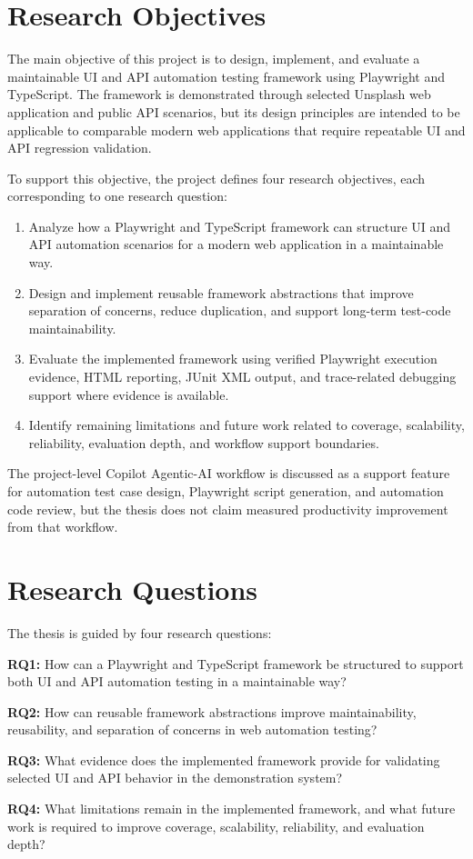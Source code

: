 \section{Research Objectives}
\label{sec:ch1-research-objectives}

The main objective of this project is to design, implement, and evaluate a maintainable UI and API automation testing framework using Playwright and TypeScript. The framework is demonstrated through selected Unsplash web application and public API scenarios, but its design principles are intended to be applicable to comparable modern web applications that require repeatable UI and API regression validation.

To support this objective, the project defines four research objectives, each corresponding to one research question:

\begin{enumerate}
  \item Analyze how a Playwright and TypeScript framework can structure UI and API automation scenarios for a modern web application in a maintainable way.
  \item Design and implement reusable framework abstractions that improve separation of concerns, reduce duplication, and support long-term test-code maintainability.
  \item Evaluate the implemented framework using verified Playwright execution evidence, HTML reporting, JUnit XML output, and trace-related debugging support where evidence is available.
  \item Identify remaining limitations and future work related to coverage, scalability, reliability, evaluation depth, and workflow support boundaries.
\end{enumerate}

The project-level Copilot Agentic-AI workflow is discussed as a support feature for automation test case design, Playwright script generation, and automation code review, but the thesis does not claim measured productivity improvement from that workflow.

\section{Research Questions}
\label{sec:ch1-research-questions}

The thesis is guided by four research questions:

\noindent\textbf{RQ1:} How can a Playwright and TypeScript framework be structured to support both UI and API automation testing in a maintainable way?

\noindent\textbf{RQ2:} How can reusable framework abstractions improve maintainability, reusability, and separation of concerns in web automation testing?

\noindent\textbf{RQ3:} What evidence does the implemented framework provide for validating selected UI and API behavior in the demonstration system?

\noindent\textbf{RQ4:} What limitations remain in the implemented framework, and what future work is required to improve coverage, scalability, reliability, and evaluation depth?
